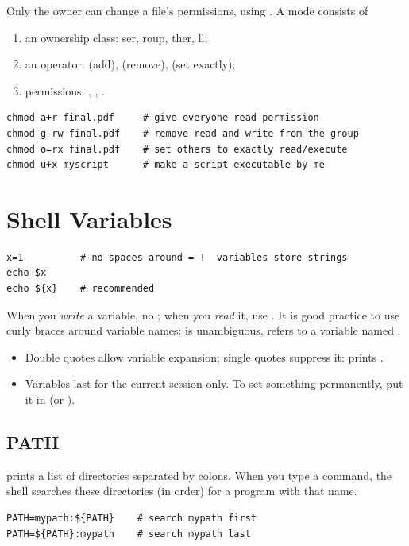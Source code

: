 Only the owner can change a file's permissions, using .
A mode consists of
\begin{enumerate}
  \item an ownership class: ser, roup, ther, ll;
  \item an operator: \code{+} (add), \code{-} (remove), \code{=} (set exactly);
  \item permissions: , , .
\end{enumerate}
\begin{lstlisting}[style=bash]
chmod a+r final.pdf     # give everyone read permission
chmod g-rw final.pdf    # remove read and write from the group
chmod o=rx final.pdf    # set others to exactly read/execute
chmod u+x myscript      # make a script executable by me
\end{lstlisting}

\section{Shell Variables}
\begin{lstlisting}[style=bash]
x=1          # no spaces around = !  variables store strings
echo $x
echo ${x}    # recommended
\end{lstlisting}
When you \emph{write} a variable, no \code{\$}; when you \emph{read} it, use
\code{\$}. It is good practice to use curly braces around variable names:
 is unambiguous,  refers to a variable named
.

\begin{itemize}
  \item Double quotes allow variable expansion; single quotes suppress it:
         prints .
  \item Variables last for the current session only. To set something
        permanently, put it in  (or
        ).
\end{itemize}

\subsection*{PATH}
 prints a list of directories separated by colons. When you
type a command, the shell searches these directories (in order) for a program
with that name.
\begin{lstlisting}[style=bash]
PATH=mypath:${PATH}    # search mypath first
PATH=${PATH}:mypath    # search mypath last
\end{lstlisting}

